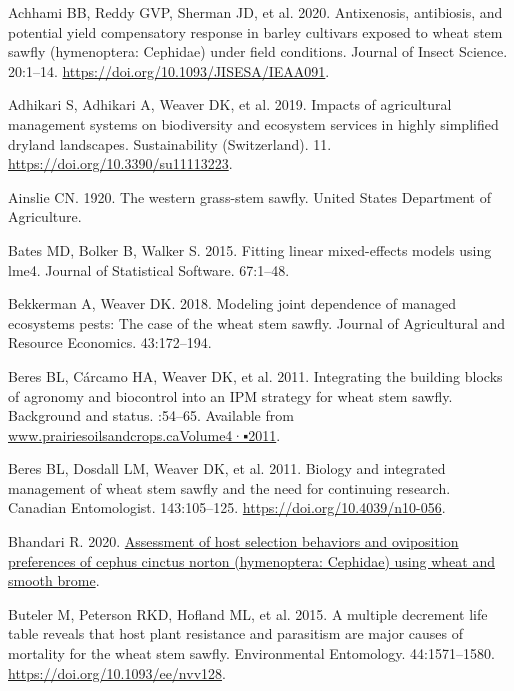 \documentclass[
]{article}
\newlength{\cslhangindent}
\newenvironment{CSLReferences}[2] %
 {\begin{list}{}{%
  \setlength{\itemindent}{0pt}
  \setlength{\leftmargin}{0pt}
  \setlength{\parsep}{0pt}
  \ifodd #1
   \setlength{\leftmargin}{\cslhangindent}
   \setlength{\itemindent}{-1\cslhangindent}
  \fi
  \setlength{\itemsep}{#2\baselineskip}}}
 {\end{list}}
\begin{document}
\label{refs}
\begin{CSLReferences}{0}{1}
Achhami BB, Reddy GVP, Sherman JD, et al. 2020. Antixenosis, antibiosis,
and potential yield compensatory response in barley cultivars exposed to
wheat stem sawfly (hymenoptera: Cephidae) under field conditions.
Journal of Insect Science. 20:1--14.
\url{https://doi.org/10.1093/JISESA/IEAA091}.

Adhikari S, Adhikari A, Weaver DK, et al. 2019. Impacts of agricultural
management systems on biodiversity and ecosystem services in highly
simplified dryland landscapes. Sustainability (Switzerland). 11.
\url{https://doi.org/10.3390/su11113223}.

Ainslie CN. 1920. The western grass-stem sawfly. United States
Department of Agriculture.

Bates MD, Bolker B, Walker S. 2015. Fitting linear mixed-effects models
using lme4. Journal of Statistical Software. 67:1--48.

Bekkerman A, Weaver DK. 2018. Modeling joint dependence of managed
ecosystems pests: The case of the wheat stem sawfly. Journal of
Agricultural and Resource Economics. 43:172--194.

Beres BL, Cárcamo HA, Weaver DK, et al. 2011. Integrating the building
blocks of agronomy and biocontrol into an IPM strategy for wheat stem
sawfly. Background and status. :54--65. Available from
\href{https://www.prairiesoilsandcrops.caVolume4·▪2011}{www.prairiesoilsandcrops.caVolume4·▪2011}.

Beres BL, Dosdall LM, Weaver DK, et al. 2011. Biology and integrated
management of wheat stem sawfly and the need for continuing research.
Canadian Entomologist. 143:105--125.
\url{https://doi.org/10.4039/n10-056}.

Bhandari R. 2020.
\href{https://www.ncbi.nlm.nih.gov/pubmed/25246403}{Assessment of host
selection behaviors and oviposition preferences of cephus cinctus norton
(hymenoptera: Cephidae) using wheat and smooth brome}.

Buteler M, Peterson RKD, Hofland ML, et al. 2015. A multiple decrement
life table reveals that host plant resistance and parasitism are major
causes of mortality for the wheat stem sawfly. Environmental Entomology.
44:1571--1580. \url{https://doi.org/10.1093/ee/nvv128}.


\end{CSLReferences}
\end{document}
